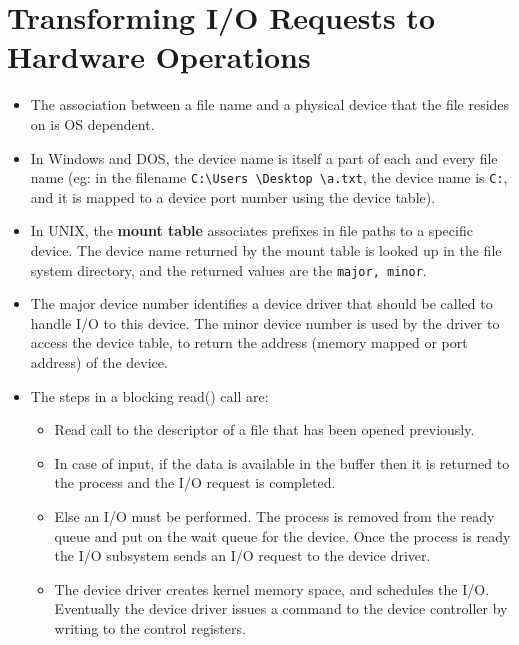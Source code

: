 \documentclass{article}
\theoremstyle{plain}
\theoremstyle{definition}
\begin{document}
\section{Transforming I/O Requests to Hardware Operations}
\begin{itemize}
    \item The association between a file name and a physical device that the file resides on is OS dependent. 
    
    \item In Windows and DOS, the device name is itself a part of each and every file name (eg: in the filename \texttt{C:\textbackslash Users \textbackslash Desktop \textbackslash a.txt}, the device name is \texttt{C:}, and it is mapped to a device port number using the device table).
    
    \item In UNIX, the \textbf{mount table} associates prefixes in file paths to a specific device. The device name returned by the mount table is looked up in the file system directory, and the returned values are the \texttt{major, minor}. 
    
    \item The major device number identifies a device driver that should be called to handle I/O to this device. The minor device number is used by the driver to access the device table, to return the address (memory mapped or port address) of the device. 
    
    \item The steps in a blocking read() call are:
    
    \begin{itemize}
        \item Read call to the descriptor of a file that has been opened previously.
        
        \item In case of input, if the data is available in the buffer then it is returned to the process and the I/O request is completed. 
        
        \item Else an I/O must be performed. The process is removed from the ready queue and put on the wait queue for the device. Once the process is ready the I/O subsystem sends an I/O request to the device driver. 
        
        \item The device driver creates kernel memory space, and schedules the I/O. Eventually the device driver issues a command to the device controller by writing to the control registers. 
        

\end{itemize}
\end{itemize}
\end{document}
